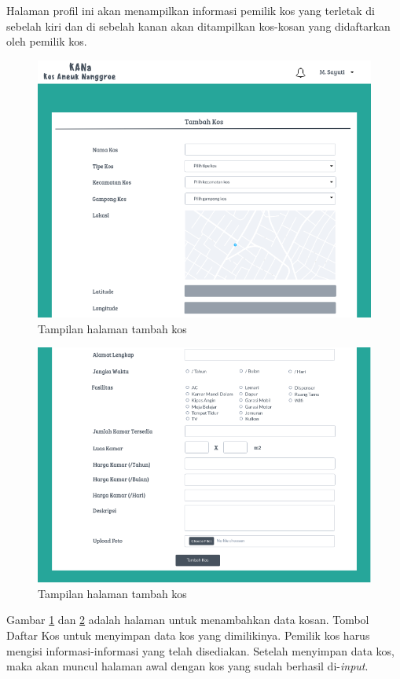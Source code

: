 \begin{enumerate}[a.]
Halaman profil ini akan menampilkan informasi pemilik kos yang terletak di sebelah kiri dan di sebelah kanan akan ditampilkan kos-kosan yang didaftarkan oleh pemilik kos. 
	
	\begin{figure}[H]
		\centering
		\includegraphics[scale=0.5]{gambar/web4}
		\caption{Tampilan halaman tambah kos}
		\label{webb4}
	\end{figure}
	
	\begin{figure}[H]
		\centering
		\includegraphics[scale=0.5]{gambar/web4a}
		\caption{Tampilan halaman tambah kos}
		\label{web4a}
	\end{figure}
	
Gambar \ref{webb4} dan \ref{web4a} adalah halaman untuk menambahkan data kosan. Tombol Daftar Kos untuk menyimpan data kos yang dimilikinya. Pemilik kos harus mengisi informasi-informasi yang telah disediakan. Setelah menyimpan data kos, maka akan muncul halaman awal dengan kos yang sudah berhasil di-\textit{input}.
	

\end{enumerate}
